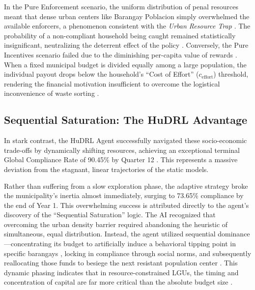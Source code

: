 In the Pure Enforcement scenario, the uniform distribution of penal resources meant that dense urban centers like Barangay Poblacion simply overwhelmed the available enforcers, a phenomenon consistent with the \textit{Urban Resource Trap} \citep{Nishimura2022}. The probability of a non-compliant household being caught remained statistically insignificant, neutralizing the deterrent effect of the policy \citep{Badua2022}. Conversely, the Pure Incentives scenario failed due to the diminishing per-capita value of rewards \citep{MuZhang2021}. When a fixed municipal budget is divided equally among a large population, the individual payout drops below the household's ``Cost of Effort'' ($c_{\text{effort}}$) threshold, rendering the financial motivation insufficient to overcome the logistical inconvenience of waste sorting \citep{Chen2023, Corcoran2020}.

\subsection{Sequential Saturation: The HuDRL Advantage}
In stark contrast, the HuDRL Agent successfully navigated these socio-economic trade-offs by dynamically shifting resources, achieving an exceptional terminal Global Compliance Rate of 90.45\% by Quarter 12 \citep{Jimenez2025, ZhengAI2022}. This represents a massive deviation from the stagnant, linear trajectories of the static models. 

Rather than suffering from a slow exploration phase, the adaptive strategy broke the municipality's inertia almost immediately, surging to 73.65\% compliance by the end of Year 1. This overwhelming success is attributed directly to the agent's discovery of the ``Sequential Saturation'' logic. The AI recognized that overcoming the urban density barrier required abandoning the heuristic of simultaneous, equal distribution. Instead, the agent utilized sequential dominance---concentrating its budget to artificially induce a behavioral tipping point in specific barangays \citep{Centola2018, Nyborg2016}, locking in compliance through social norms, and subsequently reallocating those funds to besiege the next resistant population center \citep{Nishimura2022}. This dynamic phasing indicates that in resource-constrained LGUs, the timing and concentration of capital are far more critical than the absolute budget size \citep{Jimenez2025}.

